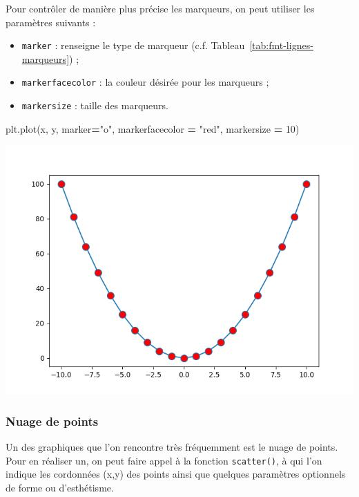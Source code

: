 \documentclass[
  12pt,
]{book}
\newenvironment{Shaded}{\begin{snugshade}}{\end{snugshade}}
\newcommand{\DecValTok}[1]{\textcolor[rgb]{0.00,0.00,0.81}{#1}}
\newcommand{\NormalTok}[1]{#1}
\newcommand{\OperatorTok}[1]{\textcolor[rgb]{0.81,0.36,0.00}{\textbf{#1}}}
\newcommand{\StringTok}[1]{\textcolor[rgb]{0.31,0.60,0.02}{#1}}
\providecommand{\tightlist}{%
  \setlength{\itemsep}{0pt}\setlength{\parskip}{0pt}}
\numberwithin{equation}{section}
\numberwithin{countremarque}{section}
\begin{document}
Pour contrôler de manière plus précise les marqueurs, on peut utiliser les paramètres suivants :

\begin{itemize}
\tightlist
\item
  \texttt{marker} : renseigne le type de marqueur (c.f. Tableau~\ref{tab:fmt-lignes-marqueurs}) ;
\item
  \texttt{markerfacecolor} : la couleur désirée pour les marqueurs ;
\item
  \texttt{markersize} : taille des marqueurs.
\end{itemize}

\begin{Shaded}
\begin{Highlighting}[]
\NormalTok{plt.plot(x, y, marker}\OperatorTok{=}\StringTok{"o"}\NormalTok{, markerfacecolor }\OperatorTok{=} \StringTok{"red"}\NormalTok{, markersize }\OperatorTok{=} \DecValTok{10}\NormalTok{)}
\end{Highlighting}
\end{Shaded}

\begin{center}\includegraphics[width=9.03in]{figs/pyplot/lignes_marqueurs} \end{center}

\subsubsection{Nuage de points}\label{nuage-de-points}

Un des graphiques que l'on rencontre très fréquemment est le nuage de points. Pour en réaliser un, on peut faire appel à la fonction \texttt{scatter()}, à qui l'on indique les cordonnées (x,y) des points ainsi que quelques paramètres optionnels de forme ou d'esthétisme.
\end{document}
